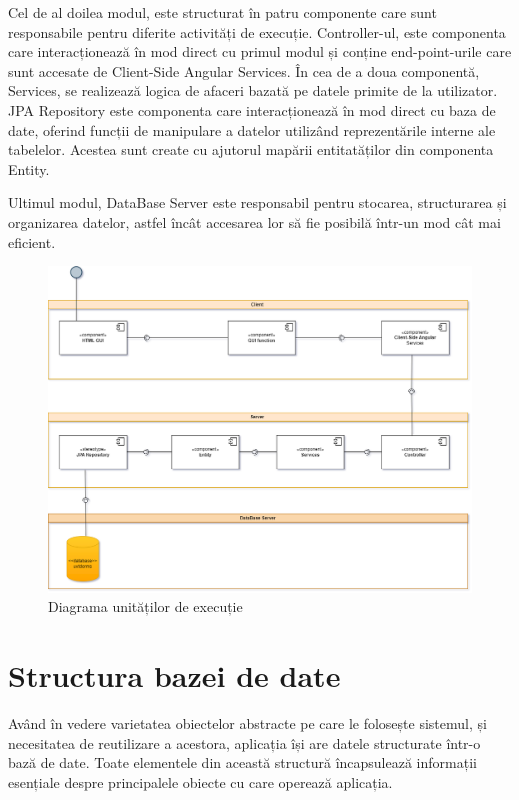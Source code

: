 \documentclass[12pt,a4paper]{report}
\theoremstyle{definition}
\theoremstyle{remark}
\begin{document}
\par Cel de al doilea modul, este structurat în patru componente care sunt responsabile pentru diferite activități de execuție. Controller-ul, este componenta care interacționează în mod direct cu primul modul și conține end-point-urile care sunt accesate de  Client-Side Angular Services. În cea de a doua componentă, Services, se realizează logica de afaceri bazată pe datele primite de la utilizator. JPA Repository este componenta care interacționează în mod direct cu baza de date, oferind funcții de manipulare a datelor utilizând reprezentările interne ale tabelelor. Acestea sunt create cu ajutorul mapării entitatăților din componenta Entity.

\par Ultimul modul, DataBase Server este responsabil pentru stocarea, structurarea și organizarea datelor, astfel încât accesarea lor să fie posibilă într-un mod cât mai eficient.

\begin{figure}[H]
    \centering
    \includegraphics[width=0.75\linewidth]{resurse/diagrame/DiagramaDEEXECUTIE.drawio.png}
    \caption{Diagrama unităților de execuție}
\end{figure}

\section{Structura bazei de date}\label{sec:architectura-bazei-de-date}
\par Având în vedere varietatea obiectelor abstracte pe care le folosește sistemul, și necesitatea de reutilizare a acestora, aplicația își are datele structurate într-o bază de date. Toate elementele din această structură încapsulează informații esențiale despre principalele obiecte cu care operează aplicația.
\end{document}
